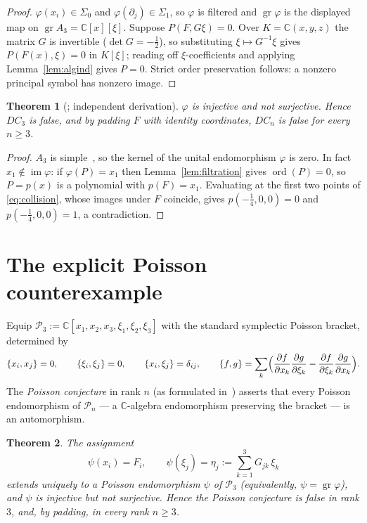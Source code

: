 \documentclass[11pt]{article}
\newtheorem{theorem}{Theorem}
\theoremstyle{remark}
\newcommand{\C}{\mathbb{C}}
\newcommand{\A}{A_3}
\newcommand{\ord}{\operatorname{ord}}
\newcommand{\gr}{\operatorname{gr}}
\begin{document}
\begin{proof}
$\varphi(x_i)\in\Sigma_0$ and $\varphi(\partial_j)\in\Sigma_1$, so
$\varphi$ is filtered and $\gr\varphi$ is the displayed map on
$\gr\A=\C[x][\xi]$. Suppose $P(F,G\xi)=0$. Over $K=\C(x,y,z)$ the matrix
$G$ is invertible ($\det G=-\tfrac12$), so substituting
$\xi\mapsto G^{-1}\xi$ gives $P(F(x),\xi)=0$ in $K[\xi]$; reading off
$\xi$-coefficients and applying Lemma~\ref{lem:algind} gives $P=0$. Strict
order preservation follows: a nonzero principal symbol has nonzero image.
\end{proof}

\begin{theorem}[{\cite[Cor.~7]{OP2026}}; independent derivation]\label{thm:weyl}
$\varphi$ is injective and not surjective. Hence $DC_3$ is false, and by
padding $F$ with identity coordinates, $DC_n$ is false for every $n\ge 3$.
\end{theorem}

\begin{proof}
$\A$ is simple~\cite{Dixmier1968}, so the kernel of the unital endomorphism
$\varphi$ is zero. In fact $x_1\notin\operatorname{im}\varphi$: if
$\varphi(P)=x_1$ then Lemma~\ref{lem:filtration} gives $\ord(P)=0$, so
$P=p(x)$ is a polynomial with $p(F)=x_1$. Evaluating at the first two
points of \eqref{eq:collision}, whose images under $F$ coincide, gives
$p(-\tfrac14,0,0)=0$ and $p(-\tfrac14,0,0)=1$, a contradiction.
\end{proof}

\section{The explicit Poisson counterexample}\label{sec:poisson}

Equip $\mathcal P_3 := \C[x_1,x_2,x_3,\xi_1,\xi_2,\xi_3]$ with the standard
symplectic Poisson bracket, determined by
\[
\{x_i,x_j\}=0,\qquad \{\xi_i,\xi_j\}=0,\qquad \{x_i,\xi_j\}=\delta_{ij},
\qquad
\{f,g\}=\sum_k\Bigl(\frac{\partial f}{\partial x_k}\frac{\partial
g}{\partial \xi_k}-\frac{\partial f}{\partial \xi_k}\frac{\partial
g}{\partial x_k}\Bigr).
\]
The \emph{Poisson conjecture} in rank $n$ (as formulated
in~\cite{AvdE2007}) asserts that every Poisson endomorphism of
$\mathcal P_n$ --- a $\C$-algebra endomorphism preserving the bracket ---
is an automorphism.

\begin{theorem}\label{thm:poisson}
The assignment
\[
\psi(x_i) = F_i,\qquad
\psi(\xi_j) = \eta_j := \sum_{k=1}^3 G_{jk}\,\xi_k
\]
extends uniquely to a Poisson endomorphism $\psi$ of $\mathcal P_3$
(equivalently, $\psi=\gr\varphi$), and $\psi$ is injective but not
surjective. Hence the Poisson conjecture is false in rank $3$, and, by
padding, in every rank $n\ge 3$.
\end{theorem}
\end{document}

